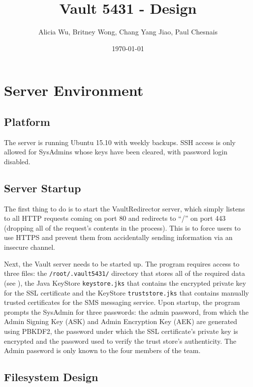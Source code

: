 \documentclass{article}
\title{Vault 5431 - Design}
\author{Alicia Wu, Britney Wong, Chang Yang Jiao, Paul Chesnais}
\date{\today}
\begin{document}
\maketitle
\thispagestyle{empty}

\section{Server Environment}
\label{sec:server_environment}

\subsection{Platform}
\label{sub:platform}
\par The server is running Ubuntu 15.10 with weekly backups. SSH access is only allowed for SysAdmins whose keys have been cleared, with password login disabled.

\subsection{Server Startup}
\label{sub:server_startup}
\par The first thing to do is to start the VaultRedirector server, which simply listens to all HTTP requests coming on port 80 and redirects to ``/'' on port 443 (dropping all of the request's contents in the process). This is to force users to use HTTPS and prevent them from accidentally sending information via an insecure channel.
\par Next, the Vault server needs to be started up. The program requires access to three files: the \texttt{/root/.vault5431/} directory that stores all of the required data (see ), the Java KeyStore \texttt{keystore.jks} that contains the encrypted private key for the SSL certificate and the KeyStore \texttt{truststore.jks} that contains manually trusted certificates for the SMS messaging service. Upon startup, the program prompts the SysAdmin for three passwords: the admin password, from which the Admin Signing Key (ASK) and Admin Encryption Key (AEK) are generated using PBKDF2, the password under which the SSL certificate's private key is encrypted and the password used to verify the trust store's authenticity. The Admin password is only known to the four members of the team.

\subsection{Filesystem Design}
\label{sub:filesystem_design}
\end{document}
